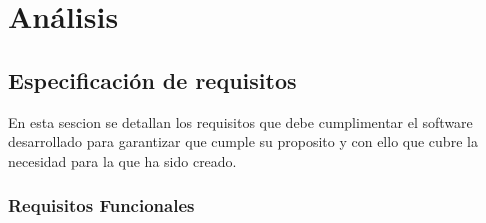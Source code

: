 \chapter{Análisis}

\section{Especificación de requisitos}

En esta sescion se detallan los requisitos que debe cumplimentar el software desarrollado para garantizar que cumple su proposito y con ello que cubre la necesidad para la que ha sido creado.

\subsection{Requisitos Funcionales}

